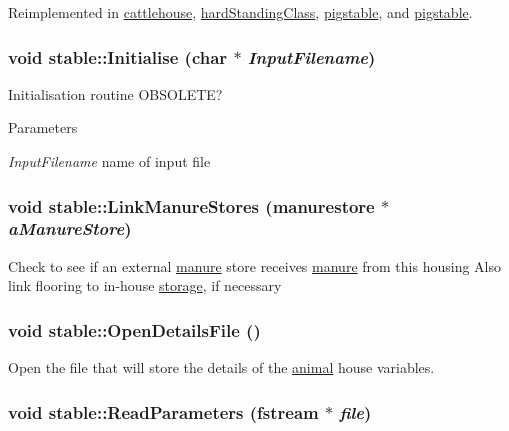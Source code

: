 Reimplemented in \hyperlink{classcattlehouse_ab71be5e3ab86351671ae24119ec62bd4}{cattlehouse}, \hyperlink{classhard_standing_class_a2a5c5d0905de0042918e0829e24145a3}{hardStandingClass}, \hyperlink{classpigstable_a55806be52263692f12d10870d9ee86eb}{pigstable}, and \hyperlink{classpigstable_a809943d3ff6f8314d92bfc1b29dec8af}{pigstable}.\hypertarget{classstable_a51684aec61abca5159208fea530f9877}{
\subsubsection[{Initialise}]{\setlength{\rightskip}{0pt plus 5cm}void stable::Initialise (char $\ast$ {\em InputFilename})}}
\label{classstable_a51684aec61abca5159208fea530f9877}


Initialisation routine OBSOLETE? 
\begin{DoxyParams}{Parameters}
\item[{\em InputFilename}]name of input file \end{DoxyParams}
\hypertarget{classstable_a55ffbd42077f05d0db4c4f7d15ac727a}{
\subsubsection[{LinkManureStores}]{\setlength{\rightskip}{0pt plus 5cm}void stable::LinkManureStores ({\bf manurestore} $\ast$ {\em aManureStore})}}
\label{classstable_a55ffbd42077f05d0db4c4f7d15ac727a}
Check to see if an external \hyperlink{classmanure}{manure} store receives \hyperlink{classmanure}{manure} from this housing Also link flooring to in-\/house \hyperlink{classstorage}{storage}, if necessary \hypertarget{classstable_a893832014c2956195ca9316345456ab5}{
\subsubsection[{OpenDetailsFile}]{\setlength{\rightskip}{0pt plus 5cm}void stable::OpenDetailsFile ()}}
\label{classstable_a893832014c2956195ca9316345456ab5}


Open the file that will store the details of the \hyperlink{classanimal}{animal} house variables. \hypertarget{classstable_ab0195f308a48e008485cf5d04955a741}{
\subsubsection[{ReadParameters}]{\setlength{\rightskip}{0pt plus 5cm}void stable::ReadParameters (fstream $\ast$ {\em file})}}
\label{classstable_ab0195f308a48e008485cf5d04955a741}



